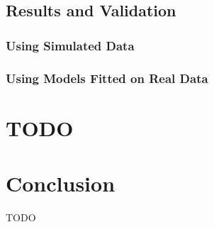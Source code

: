 \documentclass{rapportCS}
\begin{document}
\subsection{Results and Validation}

\subsubsection{Using Simulated Data}

\subsubsection{Using Models Fitted on Real Data}

\newpage

\section{TODO}

\newpage

\section{Conclusion}
TODO
\newpage



\end{document}
